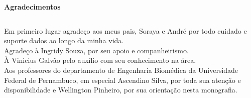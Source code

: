 \begin{center}
\textbf{Agradecimentos}
\end{center}

$\!$\\
\begin{flushright}
\parbox{0.65\linewidth}{
\itshape \flushright

Em primeiro lugar agradeço aos meus pais, Soraya e André por todo cuidado e suporte dados ao longo da minha vida.\\
\vspace{0.5 in}
Agradeço à Ingridy Souza, por seu apoio e companheirismo.\\
\vspace{0.5cm}
À Vinicius Galvão pelo auxílio com seu conhecimento na área.\\
\vspace{0.5cm}
Aos professores do departamento de Engenharia Biomédica da Universidade Federal de Pernambuco, 
em especial Ascendino Silva, por toda sua atenção e disponibilidade e Wellington Pinheiro, 
por sua orientação nesta monografia.
}
\end{flushright}

